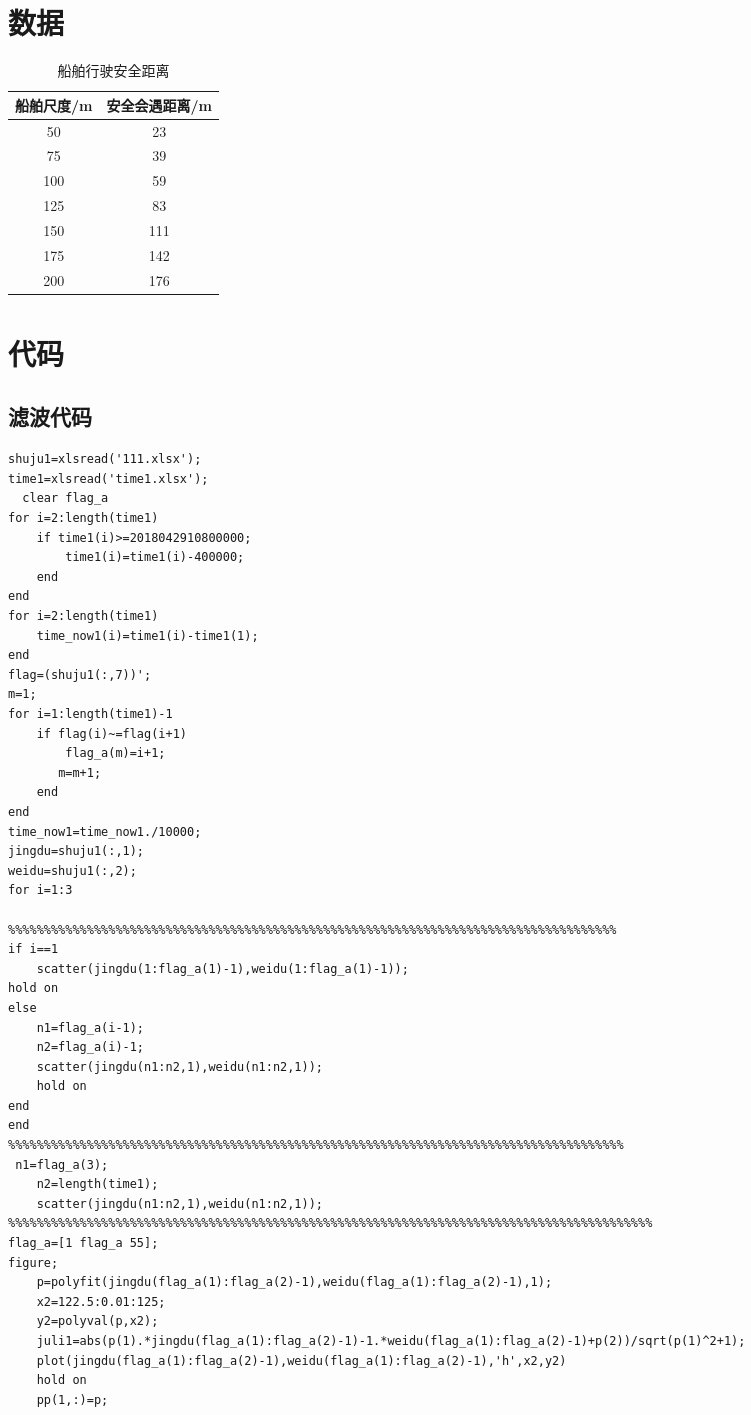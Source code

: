 \clearpage
{}
\begin{appendix}
	\section{数据}
	\begin{table}[htbp]
		\centering
		\caption{船舶行驶安全距离}
		\begin{tabular}{cc}
			\toprule
			船舶尺度/m	&	安全会遇距离/m	\\
			\midrule
			50			&	23				\\
			75			&	39				\\
			100			&	59				\\
			125			&	83				\\
			150			&	111				\\
			175			&	142				\\
			200			&	176				\\
			\bottomrule
		\end{tabular}
	\end{table}
	\section{代码}
	\subsection{滤波代码}
	\begin{lstlisting}[caption=Kalman.m]
shuju1=xlsread('111.xlsx');
time1=xlsread('time1.xlsx');
  clear flag_a
for i=2:length(time1)
    if time1(i)>=2018042910800000;
        time1(i)=time1(i)-400000;
    end
end
for i=2:length(time1)
    time_now1(i)=time1(i)-time1(1);
end
flag=(shuju1(:,7))';
m=1;
for i=1:length(time1)-1
    if flag(i)~=flag(i+1)
        flag_a(m)=i+1;
       m=m+1;
    end
end
time_now1=time_now1./10000;
jingdu=shuju1(:,1);
weidu=shuju1(:,2);
for i=1:3

%%%%%%%%%%%%%%%%%%%%%%%%%%%%%%%%%%%%%%%%%%%%%%%%%%%%%%%%%%%%%%%%%%%%%%%%%%%%%%%%%%%%%    
if i==1
    scatter(jingdu(1:flag_a(1)-1),weidu(1:flag_a(1)-1));
hold on 
else
    n1=flag_a(i-1);
    n2=flag_a(i)-1;
    scatter(jingdu(n1:n2,1),weidu(n1:n2,1));
    hold on
end
end
%%%%%%%%%%%%%%%%%%%%%%%%%%%%%%%%%%%%%%%%%%%%%%%%%%%%%%%%%%%%%%%%%%%%%%%%%%%%%%%%%%%%%%
 n1=flag_a(3);
    n2=length(time1);
    scatter(jingdu(n1:n2,1),weidu(n1:n2,1));
%%%%%%%%%%%%%%%%%%%%%%%%%%%%%%%%%%%%%%%%%%%%%%%%%%%%%%%%%%%%%%%%%%%%%%%%%%%%%%%%%%%%%%%%%%
flag_a=[1 flag_a 55];
figure;
    p=polyfit(jingdu(flag_a(1):flag_a(2)-1),weidu(flag_a(1):flag_a(2)-1),1);
    x2=122.5:0.01:125;
    y2=polyval(p,x2);
    juli1=abs(p(1).*jingdu(flag_a(1):flag_a(2)-1)-1.*weidu(flag_a(1):flag_a(2)-1)+p(2))/sqrt(p(1)^2+1);
    plot(jingdu(flag_a(1):flag_a(2)-1),weidu(flag_a(1):flag_a(2)-1),'h',x2,y2)
    hold on
    pp(1,:)=p;


\end{lstlisting}
\end{appendix}
